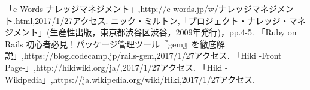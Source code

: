\begin{thebibliography}{5}
「e-Words ナレッジマネジメント」,{http://e-words.jp/w/ナレッジマネジメント.html},2017/1/27アクセス.
ニック・ミルトン,「プロジェクト・ナレッジ・マネジメント」(生産性出版，東京都渋谷区渋谷，2009年発行)，pp.4-5.
「Ruby on Rails 初心者必見！パッケージ管理ツール『gem』を徹底解説」,{https://blog.codecamp.jp/rails-gem},2017/1/27アクセス.
「Hiki -Front Page-」,{http://hikiwiki.org/ja/},2017/1/27アクセス.
「Hiki -Wikipedia」,{https://ja.wikipedia.org/wiki/Hiki},2017/1/27アクセス.
\end{thebibliography}